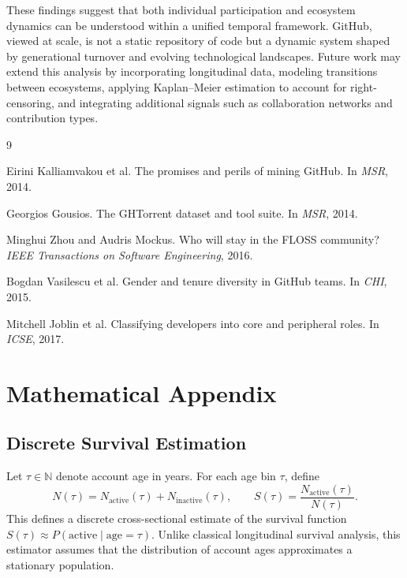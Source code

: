 \documentclass[12pt,a4paper]{article}
\begin{document}
These findings suggest that both individual participation and ecosystem dynamics can be understood within a unified temporal framework. GitHub, viewed at scale, is not a static repository of code but a dynamic system shaped by generational turnover and evolving technological landscapes. Future work may extend this analysis by incorporating longitudinal data, modeling transitions between ecosystems, applying Kaplan--Meier estimation to account for right-censoring, and integrating additional signals such as collaboration networks and contribution types.



\begin{thebibliography}{9}

Eirini Kalliamvakou et al.
\newblock The promises and perils of mining GitHub.
\newblock In \emph{MSR}, 2014.

Georgios Gousios.
\newblock The GHTorrent dataset and tool suite.
\newblock In \emph{MSR}, 2014.

Minghui Zhou and Audris Mockus.
\newblock Who will stay in the FLOSS community?
\newblock \emph{IEEE Transactions on Software Engineering}, 2016.

Bogdan Vasilescu et al.
\newblock Gender and tenure diversity in GitHub teams.
\newblock In \emph{CHI}, 2015.

Mitchell Joblin et al.
\newblock Classifying developers into core and peripheral roles.
\newblock In \emph{ICSE}, 2017.

\end{thebibliography}

\appendix

\section{Mathematical Appendix}

\subsection{Discrete Survival Estimation}

Let $\tau \in \mathbb{N}$ denote account age in years. For each age bin $\tau$, define
\[
N(\tau) = N_{\text{active}}(\tau) + N_{\text{inactive}}(\tau),
\qquad
S(\tau) = \frac{N_{\text{active}}(\tau)}{N(\tau)}.
\]
This defines a discrete cross-sectional estimate of the survival function $S(\tau) \approx P(\text{active} \mid \text{age} = \tau)$. Unlike classical longitudinal survival analysis, this estimator assumes that the distribution of account ages approximates a stationary population.
\end{document}
